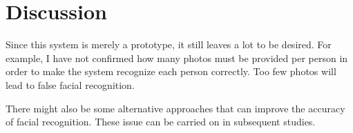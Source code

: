 \section{Discussion}
Since this system is merely a prototype, it still leaves a lot to be desired. For example, I have
not confirmed how many photos must be provided per person in order to make the system recognize each person
correctly. Too few photos will lead to false facial recognition.
\newline

There might also be some alternative approaches that can improve the accuracy of facial recognition. These
issue can be carried on in subsequent studies.

